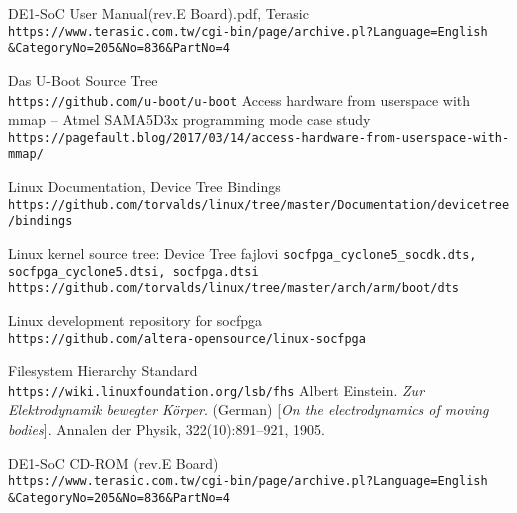 \begin{thebibliography}{9}
DE1-SoC User Manual(rev.E Board).pdf, Terasic\\ \verb+https://www.terasic.com.tw/cgi-bin/page/archive.pl?Language=English+\\\verb+&CategoryNo=205&No=836&PartNo=4 +
 
Das U-Boot Source Tree\\
\verb+https://github.com/u-boot/u-boot+
Access hardware from userspace with mmap – Atmel SAMA5D3x programming mode case study\\ \verb+https://pagefault.blog/2017/03/14/access-hardware-from-userspace-with-mmap/+

Linux Documentation, Device Tree Bindings\\
\verb+https://github.com/torvalds/linux/tree/master/Documentation/devicetree/bindings+

Linux kernel source tree: Device Tree fajlovi \texttt{socfpga\_cyclone5\_socdk.dts, socfpga\_cyclone5.dtsi, socfpga.dtsi}\\
\verb+https://github.com/torvalds/linux/tree/master/arch/arm/boot/dts+

Linux development repository for socfpga\\ \verb+https://github.com/altera-opensource/linux-socfpga+

Filesystem Hierarchy Standard \\ \verb+https://wiki.linuxfoundation.org/lsb/fhs+
Albert Einstein. 
\textit{Zur Elektrodynamik bewegter K{\"o}rper}. (German) 
[\textit{On the electrodynamics of moving bodies}]. 
Annalen der Physik, 322(10):891–921, 1905.

DE1-SoC CD-ROM (rev.E Board)\\
\verb+https://www.terasic.com.tw/cgi-bin/page/archive.pl?Language=English+\\\verb+&CategoryNo=205&No=836&PartNo=4+
\end{thebibliography}
